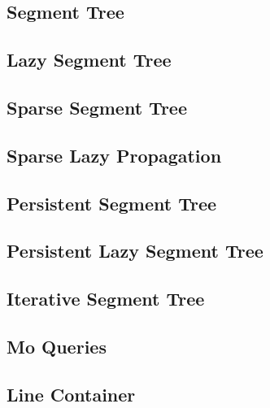 \subsection{Segment Tree}
\raggedbottom
\hrulefill
\subsection{Lazy Segment Tree}
\raggedbottom
\hrulefill
\subsection{Sparse Segment Tree}
\raggedbottom
\hrulefill
\subsection{Sparse Lazy Propagation}
\raggedbottom
\hrulefill
\subsection{Persistent Segment Tree}
\raggedbottom
\hrulefill
\subsection{Persistent Lazy Segment Tree}
\raggedbottom
\hrulefill
\subsection{Iterative Segment Tree}
\raggedbottom
\hrulefill
\subsection{Mo Queries}
\raggedbottom
\hrulefill
\subsection{Line Container}
\raggedbottom
\hrulefill
